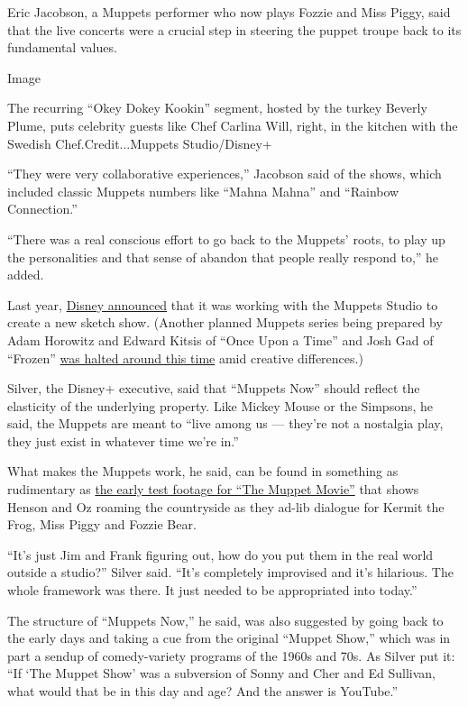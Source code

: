 Eric Jacobson, a Muppets performer who now plays Fozzie and Miss Piggy,
said that the live concerts were a crucial step in steering the puppet
troupe back to its fundamental values.

Image

The recurring ``Okey Dokey Kookin'' segment, hosted by the turkey
Beverly Plume, puts celebrity guests like Chef Carlina Will, right, in
the kitchen with the Swedish Chef.Credit...Muppets Studio/Disney+

``They were very collaborative experiences,'' Jacobson said of the
shows, which included classic Muppets numbers like ``Mahna Mahna'' and
``Rainbow Connection.''

``There was a real conscious effort to go back to the Muppets' roots, to
play up the personalities and that sense of abandon that people really
respond to,'' he added.

Last year,
\href{https://www.hollywoodreporter.com/live-feed/muppets-shortform-series-a-go-at-disney-1234166}{Disney
announced} that it was working with the Muppets Studio to create a new
sketch show. (Another planned Muppets series being prepared by Adam
Horowitz and Edward Kitsis of ``Once Upon a Time'' and Josh Gad of
``Frozen''
\href{https://www.hollywoodreporter.com/live-feed/muppets-disney-comedy-series-scrapped-1238475}{was
halted around this time} amid creative differences.)

Silver, the Disney+ executive, said that ``Muppets Now'' should reflect
the elasticity of the underlying property. Like Mickey Mouse or the
Simpsons, he said, the Muppets are meant to ``live among us --- they're
not a nostalgia play, they just exist in whatever time we're in.''

What makes the Muppets work, he said, can be found in something as
rudimentary as \href{https://www.youtube.com/watch?v=ci9gPZnqiGY}{the
early test footage for ``The Muppet Movie''} that shows Henson and Oz
roaming the countryside as they ad-lib dialogue for Kermit the Frog,
Miss Piggy and Fozzie Bear.

``It's just Jim and Frank figuring out, how do you put them in the real
world outside a studio?'' Silver said. ``It's completely improvised and
it's hilarious. The whole framework was there. It just needed to be
appropriated into today.''

The structure of ``Muppets Now,'' he said, was also suggested by going
back to the early days and taking a cue from the original ``Muppet
Show,'' which was in part a sendup of comedy-variety programs of the
1960s and 70s. As Silver put it: ``If `The Muppet Show' was a subversion
of Sonny and Cher and Ed Sullivan, what would that be in this day and
age? And the answer is YouTube.''

